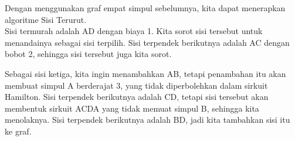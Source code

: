 \begin{example} %
Dengan menggunakan graf empat simpul sebelumnya, kita dapat menerapkan algoritme Sisi Terurut.\\

Sisi termurah adalah AD dengan biaya 1.  Kita sorot sisi tersebut untuk menandainya sebagai sisi terpilih.  
Sisi terpendek berikutnya adalah AC dengan bobot 2, sehingga sisi tersebut juga kita sorot.\\
\begin{minipage}{.5\textwidth}
\begin{center}
\end{center}
\end{minipage}
%
\begin{minipage}{.5\textwidth}
\begin{center}
\end{center}
\end{minipage}

Sebagai sisi ketiga, kita ingin menambahkan AB, tetapi penambahan itu akan membuat simpul A berderajat 3, yang tidak diperbolehkan dalam sirkuit Hamilton.  Sisi terpendek berikutnya adalah CD, tetapi sisi tersebut akan membentuk sirkuit ACDA yang tidak memuat simpul B, sehingga kita menolaknya.  Sisi terpendek berikutnya adalah BD, jadi kita tambahkan sisi itu ke graf.


\end{example}
